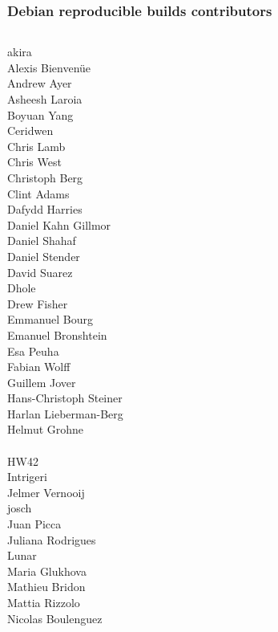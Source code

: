 \documentclass[14pt,aspectratio=169]{beamer}
\begin{document}
\begin{frame}
 \frametitle{Debian reproducible builds contributors}
 \begin{center}
  \begin{columns}
   \footnotesize
    {akira} \\
    {Alexis Bienvenüe} \\
    {Andrew Ayer} \\
    {Asheesh Laroia} \\
    Boyuan Yang \\
    {Ceridwen} \\
    {Chris Lamb} \\
    {Chris West} \\
    {Christoph Berg} \\
    Clint Adams \\
    Dafydd Harries \\
    {Daniel Kahn Gillmor} \\
    {Daniel Shahaf} \\
    Daniel Stender \\
    David Suarez \\
    {Dhole} \\
    Drew Fisher \\
    Emmanuel Bourg \\
    Emanuel Bronshtein \\
    Esa Peuha \\
    {Fabian Wolff} \\
    {Guillem Jover} \\
    Hans-Christoph Steiner \\
    Harlan Lieberman-Berg \\
    {Helmut Grohne} \\
     \\
    HW42 \\
    Intrigeri \\
    {Jelmer Vernooij} \\
    {josch} \\
    Juan Picca \\
    Juliana Rodrigues \\
    {Lunar} \\
    Maria Glukhova \\
    Mathieu Bridon \\
    {Mattia Rizzolo} \\
    Nicolas Boulenguez \\

\end{columns}
\end{center}
\end{frame}
\end{document}
